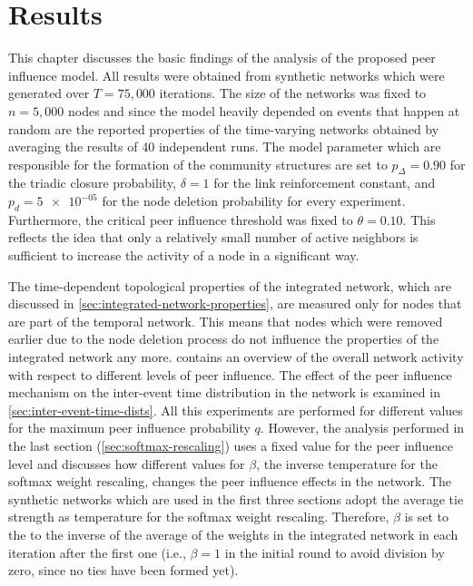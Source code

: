 \chapter{Results}
\label{cha:results}


This chapter discusses the basic findings of the analysis of the proposed peer influence model.
All results were obtained from synthetic networks which were generated over \( T = 75,000 \) iterations.
The size of the networks was fixed to \(n = 5,000 \) nodes and since the model heavily depended on events that happen at random are the reported properties of the time-varying networks obtained by averaging the results of 40 independent runs.
The model parameter which are responsible for the formation of the community structures are set to \( p_{\Delta} = 0.90 \) for the triadic closure probability, \( \delta = 1 \) for the link reinforcement constant, and \( p_{d} = \num{5e-05} \) for the node deletion probability for every experiment.
Furthermore, the critical peer influence threshold was fixed to \( \theta = 0.10 \).
This reflects the idea that only a relatively small number of active neighbors is sufficient to increase the activity of a node in a significant way.

The time-dependent topological properties of the integrated network, which are discussed in \cref{sec:integrated-network-properties}, are measured only for nodes that are part of the temporal network.
This means that nodes which were removed earlier due to the node deletion process do not influence the properties of the integrated network any more.
 contains an overview of the overall network activity with respect to different levels of peer influence.
The effect of the peer influence mechanism on the inter-event time distribution in the network is examined in \cref{sec:inter-event-time-dists}.
All this experiments are performed for different values for the maximum peer influence probability \( q \).
However, the analysis performed in the last section (\cref{sec:softmax-rescaling}) uses a fixed value for the peer influence level and discusses how different values for \( \beta \), the inverse temperature for the softmax weight rescaling, changes the peer influence effects in the network.
The synthetic networks which are used in the first three sections adopt the average tie strength as temperature for the softmax weight rescaling.
Therefore, \( \beta \) is set to the to the inverse of the average of the weights in the integrated network in each iteration after the first one (i.e., \( \beta = 1 \) in the initial round to avoid division by zero, since no ties have been formed yet).


